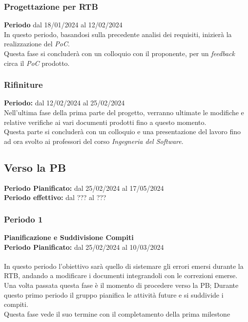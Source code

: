 \documentclass[5pt]{article}
\begin{document}
\subsubsection{Progettazione per RTB}
\textbf{Periodo} dal 18/01/2024 al 12/02/2024 
\vspace{0.3cm} \\
In questo periodo, basandosi sulla precedente analisi dei requisiti, inizierà la realizzazione del \textit{PoC}. \\
Questa fase si concluderà con un colloquio con il proponente, per un \textit{feedback} circa il \textit{PoC} prodotto.
\subsubsection{Rifiniture}
\textbf{Periodo:} dal 12/02/2024 al 25/02/2024 
\vspace{0.3cm} \\
Nell'ultima fase della prima parte del progetto, verranno ultimate le modifiche e relative verifiche ai vari documenti prodotti fino a questo momento. \\
Questa parte si concluderà con un colloquio e una presentazione del lavoro fino ad ora svolto ai professori del corso \textit{Ingegneria del Software}.

\subsection{Verso la PB}
\textbf{Periodo Pianificato:} dal 25/02/2024 al 17/05/2024 \\
\textbf{Periodo effettivo:} dal ??? al ??? \\
\subsubsection{Periodo 1}
\textbf{Pianificazione e Suddivisione Compiti} \\
\textbf{Periodo Pianificato:} dal 25/02/2024 al 10/03/2024 \\\\
In questo periodo l'obiettivo sarà quello di sistemare gli errori emersi durante la RTB, andando a modificare i documenti integrandoli con le correzioni emerse.
Una volta passata questa fase è il momento di procedere verso la PB;
Durante questo primo periodo il gruppo pianifica le attività future e si suddivide i compiti.\\
Questa fase vede il suo termine con il completamento della prima milestone
\end{document}
